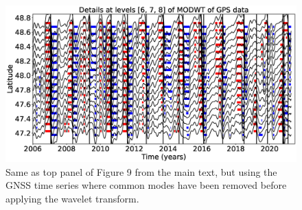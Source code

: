 \documentclass{article}
\begin{document}
\begin{figure}
\noindent\includegraphics[width=\textwidth, trim={0cm 0cm 0cm 0cm},clip]{figures/GPS_mode_details_6-7-8.eps}
\caption{Same as top panel of Figure 9 from the main text, but using the GNSS time series where common modes have been removed before applying the wavelet transform.}
\label{pngfiguresample}
\end{figure}
\end{document}
